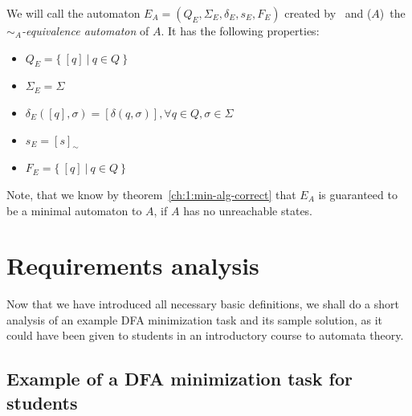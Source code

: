 \begin{definition} \label{ch:1:sim-eq-dfa}
    We will call the automaton $E_A = (Q_E, \Sigma_E, \delta_E, s_E, F_E)$ created by \CompDist\ and \RemEq($A$)\ the \emph{$\sim_A$-equivalence automaton} of $A$. It has the following properties:
    \begin{itemize}
        \item $Q_E = \{\ [q]\ |\ q \in Q\ \}$
        \item $\Sigma_E = \Sigma$
        \item $\delta_E([q], \sigma) = [\delta(q, \sigma)], \forall q \in Q, \sigma \in \Sigma$
        \item $s_E = [s]_\sim$
        \item $F_E = \{\ [q]\ |\ q \in Q\ \}$
    \end{itemize}
    Note, that we know by theorem~\ref{ch:1:min-alg-correct} that $E_A$ is guaranteed to be a minimal automaton to $A$, if $A$ has no unreachable states.
\end{definition}

%

\section{Requirements analysis}

Now that we have introduced all necessary basic definitions, we shall do a short analysis of an example DFA minimization task and its sample solution, as it could have been given to students in an introductory course to automata theory.

\subsection{Example of a DFA minimization task for students}


